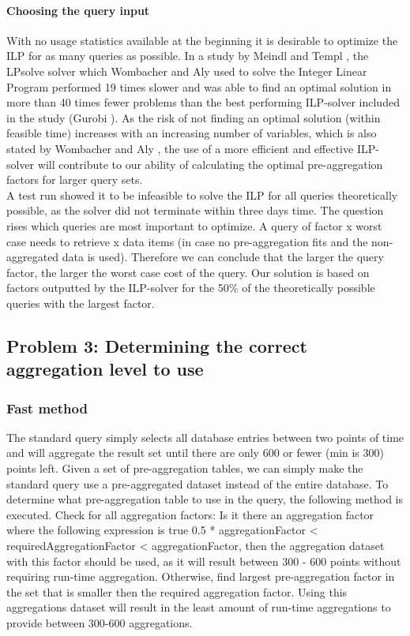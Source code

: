 \paragraph{Choosing the query input}
With no usage statistics available at the beginning it is desirable to optimize the ILP for as many queries as possible. In a study by Meindl and Templ \cite{meindl2012}, the LPsolve solver which Wombacher and Aly \cite{wombacher2011} used to solve the Integer Linear Program performed 19 times slower and was able to find an optimal solution in more than 40 times fewer problems than the best performing ILP-solver included in the study (Gurobi \cite{gurobi}). As the risk of not finding an optimal solution (within feasible time) increases with an increasing number of variables, which is also stated by Wombacher and Aly \cite{wombacher2011}, the use of a more efficient and effective ILP-solver will contribute to our ability of calculating the optimal pre-aggregation factors for larger query sets.\\

A test run showed it to be infeasible to solve the ILP for all queries theoretically possible, as the solver did not terminate within three days time. The question rises which queries are most important to optimize. A query of factor x worst case needs to retrieve x data items (in case no pre-aggregation fits and the non-aggregated data is used). Therefore we can conclude that the larger the query factor, the larger the worst case cost of the query. Our solution is based on factors outputted by the ILP-solver for the 50\% of the theoretically possible queries with the largest factor. 

\subsection{Problem 3: Determining the correct aggregation level to use}
\subsubsection{Fast method}
The standard query simply selects all database entries between two points of time and will aggregate the result set until there are only 600 or fewer (min is 300) points left. Given a set of pre-aggregation tables, we can simply make the standard query use a pre-aggregated dataset instead of the entire database. To determine what pre-aggregation table to use in the query, the following method is executed. Check for all aggregation factors: Is it there an aggregation factor where the following expression is true 0.5 * aggregationFactor < requiredAggregationFactor < aggregationFactor, then the aggregation dataset with this factor should be used, as it will result between 300 - 600 points without requiring run-time aggregation. Otherwise, find largest pre-aggregation factor in the set that is smaller then the required aggregation factor. Using this aggregations dataset will result in the least amount of run-time aggregations to provide between 300-600 aggregations.


